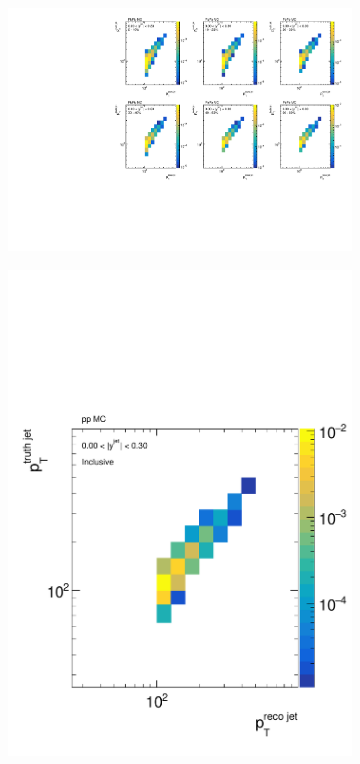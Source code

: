 \begin{figure}
\begin{subfigure}{0.7\textwidth}
\centering
\includegraphics[page=5, width=1\textwidth]{figures/main/corrections/resp_matrix_jet_PbPb_MC.pdf}
\caption{}
\label{fig:PbPb_jetspect_respmatrix}
\end{subfigure} 
\begin{subfigure}{0.30\textwidth}
\centering
\includegraphics[page=5, width=1\textwidth]{figures/main/corrections/resp_matrix_jet_pp_MC.pdf}

\end{subfigure}
\end{figure}
